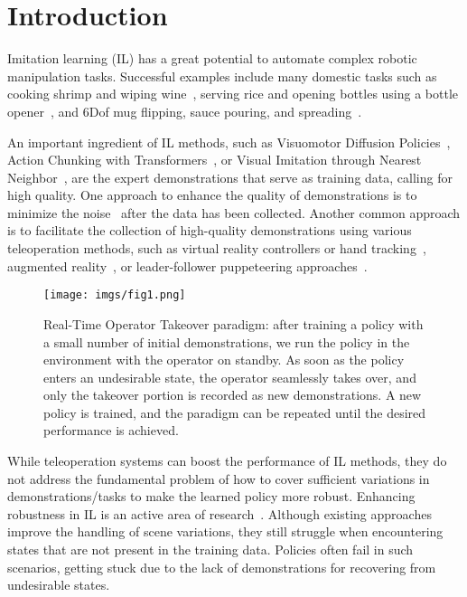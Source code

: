 \section{Introduction}

Imitation learning (IL) has a great potential to automate complex robotic manipulation tasks. Successful examples include many domestic tasks such as cooking shrimp and wiping wine~\cite{fu2024mobile}, serving rice and opening bottles using a bottle opener~\cite{ingelhag2024robotic}, and $6$Dof mug flipping, sauce pouring, and spreading~\cite{chi2023diffusion}.

An important ingredient of IL methods, such as Visuomotor Diffusion Policies~\cite{chi2023diffusion}, Action Chunking with Transformers~\cite{zhao2023learning}, or Visual Imitation through Nearest Neighbor~\cite{pari2021surprising}, are the expert demonstrations that serve as training data, calling for high quality. One approach to enhance the quality of demonstrations is to minimize the noise~\cite{wang2023imitation} after the data has been collected. Another common approach is to facilitate the collection of high-quality demonstrations using various teleoperation methods, such as virtual reality controllers or hand tracking~\cite{moletta2023virtual, welle2024quest2ros, iyer2024open, qin2023anyteleop}, augmented reality~\cite{van2024puppeteer, chen2024arcap}, or leader-follower puppeteering approaches~\cite{zhao2023learning, shaw2024bimanual, yang2024ace}.

\begin{figure} \centering \texttt{[image: imgs/fig1.png]} \caption{Real-Time Operator Takeover paradigm: after training a policy with a small number of initial demonstrations, we run the policy in the environment with the operator on standby. As soon as the policy enters an undesirable state, the operator seamlessly takes over, and only the takeover portion is recorded as new demonstrations. A new policy is trained, and the paradigm can be repeated until the desired performance is achieved.} \label{fig:fig1} \end{figure}

While teleoperation systems can boost the performance of IL methods, they do not address the fundamental problem of how to cover sufficient variations in demonstrations/tasks to make the learned policy more robust. Enhancing robustness in IL is an active area of research~\cite{hansen2021generalization, zhuang2024enhancing}. Although existing approaches improve the handling of scene variations, they still struggle when encountering states that are not present in the training data. Policies often fail in such scenarios, getting stuck due to the lack of demonstrations for recovering from undesirable states.

